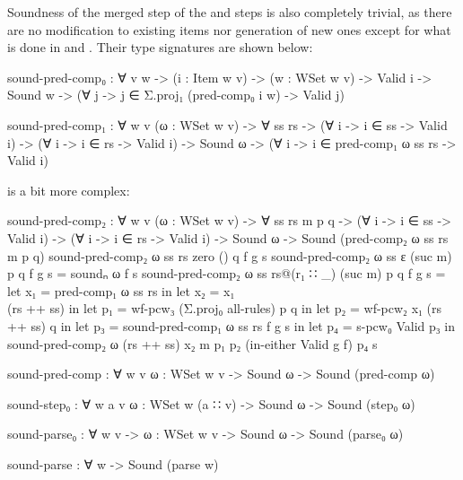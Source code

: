		Soundness of the merged step  of the 
		and  steps is also completely trivial, as there are no
		modification to existing items nor generation of new ones except for
		what is done in  and . Their type
		signatures are shown below:

		\begin{code}

			sound-pred-comp₀ : ∀ {v w} ->
			  (i : Item w v) -> 
			  (w : WSet w v) ->
			  Valid i -> Sound w ->
			  (∀ {j} -> j ∈ Σ.proj₁ (pred-comp₀ i w) -> Valid j)

			sound-pred-comp₁ : ∀ {w v} (ω : WSet w v) -> ∀ ss rs ->
			  (∀ {i} -> i ∈ ss -> Valid i) ->
			  (∀ {i} -> i ∈ rs -> Valid i) ->
			  Sound ω -> (∀ {i} -> i ∈ pred-comp₁ ω ss rs -> Valid i)
		
		\end{code}

		 is a bit more complex:

		\begin{code}

			sound-pred-comp₂ : ∀ {w v} (ω : WSet w v) -> ∀ ss rs m p q ->
			  (∀ {i} -> i ∈ ss -> Valid i) ->
			  (∀ {i} -> i ∈ rs -> Valid i) ->
			  Sound ω -> Sound (pred-comp₂ ω ss rs m p q)
			sound-pred-comp₂ ω ss rs zero () q f g s
			sound-pred-comp₂ ω ss ε (suc m) p q f g s = soundₙ ω f s
			sound-pred-comp₂ ω ss rs@(r₁ ∷ _) (suc m) p q f g s =
			  let x₁ = pred-comp₁ ω ss rs in
			  let x₂ = x₁ \\ (rs ++ ss) in
			  let p₁ = wf-pcw₃ (Σ.proj₀ all-rules) p q  in
			  let p₂ = wf-pcw₂ x₁ (rs ++ ss) q in
			  let p₃ = sound-pred-comp₁ ω ss rs f g s in
			  let p₄ = s-pcw₀ Valid p₃ in
			  sound-pred-comp₂ ω (rs ++ ss) x₂ m p₁ p₂ (in-either Valid g f) p₄ s
		
		\end{code}

		\begin{code}

			sound-pred-comp : ∀ {w v} {ω : WSet w v} -> 
			  Sound ω -> Sound (pred-comp ω)

			sound-step₀ : ∀ {w a v} {ω : WSet w (a ∷ v)} -> 
			  Sound ω -> Sound (step₀ ω)

			sound-parse₀ : ∀ {w v} -> {ω : WSet w v} -> 
			  Sound ω -> Sound (parse₀ ω)

			sound-parse : ∀ w -> Sound (parse w)

		\end{code}

